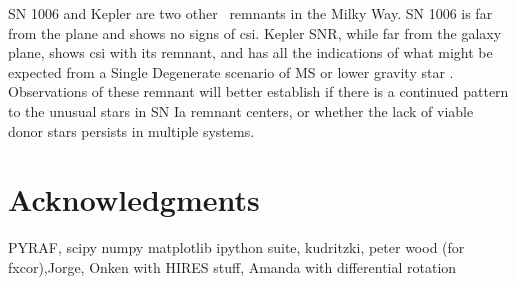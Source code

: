 SN 1006 and Kepler are two other \snia\ remnants in the Milky Way. SN 1006 is far from the plane and shows no signs of \gls{csi}. Kepler SNR, while far from the galaxy plane, shows \gls{csi} with its remnant, and has all the indications of what might be expected from a Single Degenerate scenario of MS or lower gravity star \citep{2011arXiv1103.5487C}. Observations of these remnant will better establish if there is a continued pattern to the unusual stars in SN Ia remnant centers, or whether the lack of viable donor stars persists in multiple systems. 
 
\section{Acknowledgments}
\label{sec:acknowledgments}
PYRAF, scipy numpy matplotlib ipython suite, kudritzki, peter wood (for fxcor),Jorge, Onken with HIRES stuff, Amanda with differential rotation


